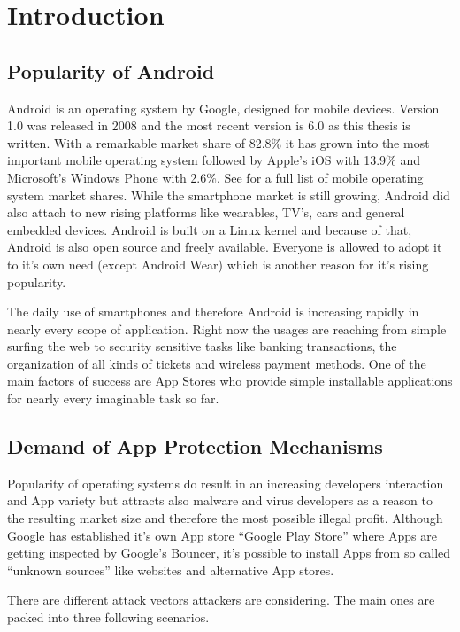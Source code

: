 \chapter{Introduction}\label{chapter:android_status_quo}

\section{Popularity of Android}
Android is an operating system by Google,
designed for mobile devices. Version 1.0 was released
in 2008 and the most recent version is 6.0 as this thesis
is written. With a remarkable market share of 82.8\%
it has grown into the most important mobile operating system
followed by Apple's iOS with 13.9\% and Microsoft's Windows
Phone with 2.6\%. See \parencite{marketshare} for a full list
of mobile operating system market shares. While the smartphone
market is still growing, Android did also attach to new
rising platforms like wearables, TV's, cars and general
embedded devices. Android is built on a Linux kernel
and because of that, Android is also open source and freely
available. Everyone is allowed to adopt it to it's own need
(except Android Wear) which is another reason for it's
rising popularity.

The daily use of smartphones and therefore Android is increasing
rapidly in nearly every scope of application. Right now the usages
are reaching from simple surfing the web to security sensitive tasks
like banking transactions, the organization of all kinds of tickets
and wireless payment methods.
One of the main factors of success are App Stores who provide simple
installable applications for nearly every imaginable task so far.  

\section{Demand of App Protection Mechanisms}
Popularity of operating systems do result in an increasing developers
interaction and App variety but attracts also 
malware and virus developers as a reason to the resulting market
size and therefore the most possible illegal profit.
Although Google has established it's own App store
``Google Play Store'' where Apps are getting inspected by Google's Bouncer,
it's possible to install Apps from so called ``unknown sources''
like websites and alternative App stores.

There are different attack vectors attackers are considering.
The main ones are packed into three following scenarios.


